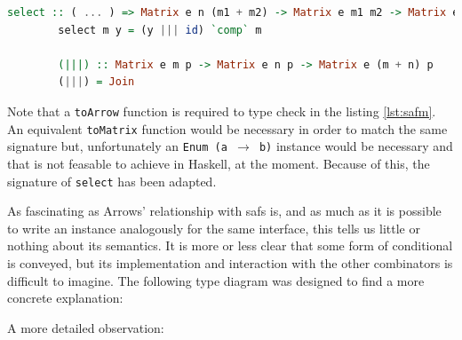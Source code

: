 \documentclass[
  oneside,
  11pt, a4paper,
  footinclude=true,
  headinclude=true,
  cleardoublepage=empty
]{scrbook}
\theoremstyle{definition}
\theoremstyle{definition}
\begin{document}
        \begin{lstlisting}[language=Haskell, label={lst:safm2}, caption={LAoP Selective instance},captionpos=b]
        select :: ( ... ) => Matrix e n (m1 + m2) -> Matrix e m1 m2 -> Matrix e n m2
        select m y = (y ||| id) `comp` m
            
        (|||) :: Matrix e m p -> Matrix e n p -> Matrix e (m + n) p
        (|||) = Join
        \end{lstlisting}{}
        
        Note that a \texttt{toArrow} function is required to type check in the listing \ref{lst:safm}. An equivalent \texttt{toMatrix} function would be necessary in order to match the same signature but, unfortunately an \texttt{Enum (a $\rightarrow$ b)} instance would be necessary and that is not feasable to achieve in Haskell, at the moment. Because of this, the signature of \texttt{select} has been adapted.
        
        As fascinating as Arrows' relationship with \glspl{saf} is, and as much as it is possible to write an instance analogously for the same interface, this tells us little or nothing about its semantics. It is more or less clear that some form of conditional is conveyed, but its implementation and interaction with the other combinators is difficult to imagine. The following type diagram was designed to find a more concrete explanation:
        
        \vskip0.2cm
        
        \begin{center}
        \end{center}
        
        A more detailed observation:
        
\end{document}

